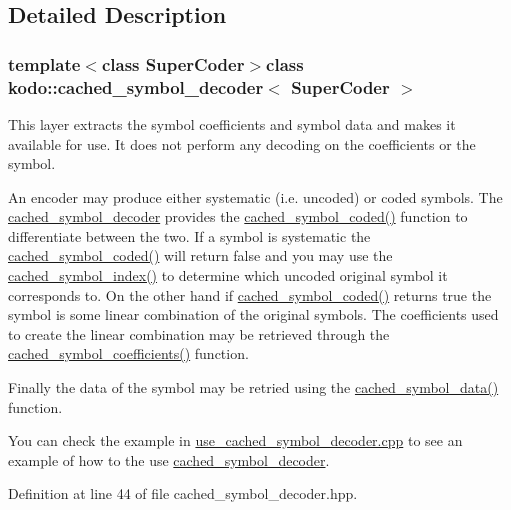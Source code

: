 \subsection{Detailed Description}
\subsubsection*{template$<$class Super\-Coder$>$class kodo\-::cached\-\_\-symbol\-\_\-decoder$<$ Super\-Coder $>$}

This layer extracts the symbol coefficients and symbol data and makes it available for use. It does not perform any decoding on the coefficients or the symbol. 

An encoder may produce either systematic (i.\-e. uncoded) or coded symbols. The \hyperlink{classkodo_1_1cached__symbol__decoder}{cached\-\_\-symbol\-\_\-decoder} provides the \hyperlink{classkodo_1_1cached__symbol__decoder_a14d17e45749ec18c37e61196b4920d45}{cached\-\_\-symbol\-\_\-coded()} function to differentiate between the two. If a symbol is systematic the \hyperlink{classkodo_1_1cached__symbol__decoder_a14d17e45749ec18c37e61196b4920d45}{cached\-\_\-symbol\-\_\-coded()} will return false and you may use the \hyperlink{classkodo_1_1cached__symbol__decoder_ab79bad65788c8764a5c568eb14d72966}{cached\-\_\-symbol\-\_\-index()} to determine which uncoded original symbol it corresponds to. On the other hand if \hyperlink{classkodo_1_1cached__symbol__decoder_a14d17e45749ec18c37e61196b4920d45}{cached\-\_\-symbol\-\_\-coded()} returns true the symbol is some linear combination of the original symbols. The coefficients used to create the linear combination may be retrieved through the \hyperlink{classkodo_1_1cached__symbol__decoder_ac20f22857eaf7833d1a362c9db24128d}{cached\-\_\-symbol\-\_\-coefficients()} function.

Finally the data of the symbol may be retried using the \hyperlink{classkodo_1_1cached__symbol__decoder_a5c018f1afa64f7dee256d5a60b47b63a}{cached\-\_\-symbol\-\_\-data()} function.

You can check the example in \hyperlink{use__cached__symbol__decoder_8cpp_source}{use\-\_\-cached\-\_\-symbol\-\_\-decoder.\-cpp} to see an example of how to the use \hyperlink{classkodo_1_1cached__symbol__decoder}{cached\-\_\-symbol\-\_\-decoder}. 

Definition at line 44 of file cached\-\_\-symbol\-\_\-decoder.\-hpp.



